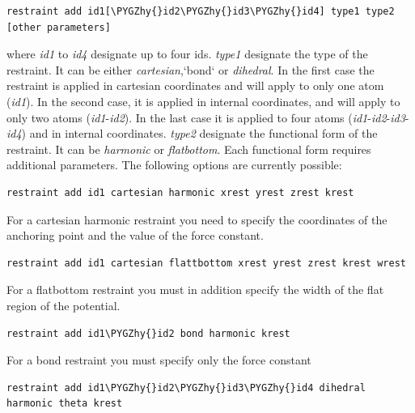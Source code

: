 \documentclass[letterpaper,10pt,english]{sphinxmanual}
\def\PYGZhy{\char`\-}
\begin{document}
\begin{Verbatim}[frame=single,commandchars=\\\{\}]
restraint add id1[\PYGZhy{}id2\PYGZhy{}id3\PYGZhy{}id4] type1 type2 [other parameters]
\end{Verbatim}

where \emph{id1} to \emph{id4} designate up to four ids. \emph{type1} designate the type of the restraint. It can be either \emph{cartesian},{}`bond{}` or \emph{dihedral}. In the first case the restraint is applied in cartesian coordinates and will apply to only one atom (\emph{id1}). In the second case, it is applied in internal coordinates, and will apply to only two atoms (\emph{id1}-\emph{id2}). In the last case it is applied to four atoms (\emph{id1}-\emph{id2}-\emph{id3}-\emph{id4}) and in internal coordinates. \emph{type2} designate the functional form of the restraint. It can be \emph{harmonic} or \emph{flatbottom}. Each functional form requires additional parameters. The following options are currently possible:

\begin{Verbatim}[frame=single,commandchars=\\\{\}]
restraint add id1 cartesian harmonic xrest yrest zrest krest
\end{Verbatim}

For a cartesian harmonic restraint you need to specify the coordinates of the anchoring point and the value of the force constant.

\begin{Verbatim}[frame=single,commandchars=\\\{\}]
restraint add id1 cartesian flattbottom xrest yrest zrest krest wrest
\end{Verbatim}

For a flatbottom restraint you must in addition specify the width of the flat region of the potential.

\begin{Verbatim}[frame=single,commandchars=\\\{\}]
restraint add id1\PYGZhy{}id2 bond harmonic krest
\end{Verbatim}

For a bond restraint you must specify only the force constant

\begin{Verbatim}[frame=single,commandchars=\\\{\}]
restraint add id1\PYGZhy{}id2\PYGZhy{}id3\PYGZhy{}id4 dihedral harmonic theta krest
\end{Verbatim}
\end{document}

